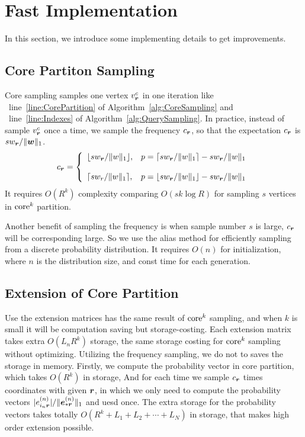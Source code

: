 \documentclass[letterpaper]{article}
\newcommand{\Sca}[3]{{#1}^{(#2)}_{i_#2#3}}%
\newcommand{\V}[1]{{\bm{{\MakeLowercase{#1}}}}}
\newcommand{\VnC}[3]{\V{#1}^{(#2)}_{#3}}
\newcommand{\norm}[2]{\|#1\|_{#2}}
\newcommand{\AlgLine}[2]{line~\ref{line:#2} of Algorithm~\ref{alg:#1}}
\begin{document}
\section{Fast Implementation}
In this section, we introduce some implementing details to get improvements.
\subsection{Core Partiton Sampling}
Core sampling samples one vertex $v^c_\V{r}$ in one iteration like
~\AlgLine{CoreSampling}{CorePartition} and ~\AlgLine{QuerySampling}{Indexes}.
In practice, instead of sample $v^c_\V{r}$ once a time,
we sample the frequency $c_\V{r}$,
so that the expectation $c_\V{r}$ is $sw_\V{r}/\norm{\V{w}}{1}$.
\begin{equation*}c_\V{r}=
    \left\{
      \begin{array}{ll}
        \lfloor sw_\V{r}/\norm{w}{1} \rfloor,
        & \hbox{$p=\lceil sw_\V{r}/\norm{w}{1} \rceil - sw_\V{r}/\norm{w}{1}$} \\\\
        \lceil sw_r/\norm{w}{1} \rceil,
        & \hbox{$p=\lfloor sw_\V{r}/\norm{w}{1} \rfloor - sw_\V{r}/\norm{w}{1}$}
      \end{array}
    \right.
\end{equation*}
It requires $O(R^k)$ complexity comparing $O(sk\log{R})$ 
for sampling $s$ vertices in ${\rm core}^k$ partition.

Another benefit of sampling the frequency is when sample number $s$ is large,
$c_\V{r}$ will be corresponding large.
So we use the alias method\cite{Vose91}
for efficiently sampling from a discrete probability distribution.
It requires $O(n)$ for initialization, where $n$ is the distribution size, and
const time for each generation.
\subsection{Extension of Core Partition}
Use the extension matrices has the same result of ${\rm core}^k$ sampling,
and when $k$ is small it will be computation saving but storage-costing.
Each extension matrix takes extra $O(L_nR^k)$ storage,
the same storage costing for ${\rm core}^k$ sampling without optimizing.
Utilizing the frequency sampling, we do not to saves the storage in memory.
Firstly, we compute the probability vector in core partition, which takes $O(R^k)$ in storage,
And for each time we sample $c_{\V{r}}$ times coordinates with given $\V{r}$,
in which we only need to compute the probability vectors 
$|\Sca{e}{n}{\V{r}}|/\norm{\VnC{e}{n}{*\V{r}}}{1}$ and uesd once.
The extra storage for the probability vectors takes totally
$O(R^k + L_1 + L_2 + \cdots + L_N)$ in storage,
that makes high order extension possible.
\end{document}
